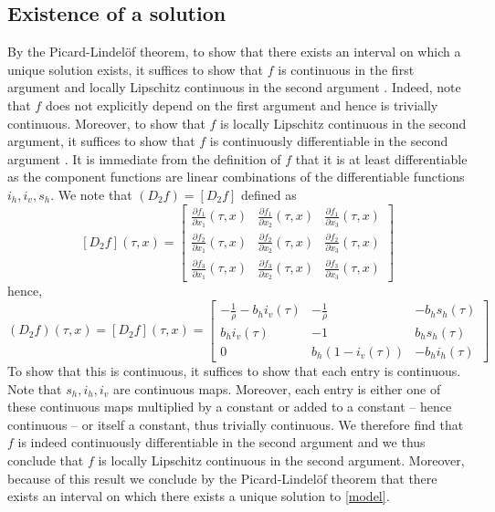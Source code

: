 \subsection{Existence of a solution}
By the Picard-Lindel\"{o}f theorem, to show that there exists an interval on which a unique solution exists, it suffices to show that $f$ is continuous in the first argument and locally Lipschitz continuous in the second argument \cite{lecturenotes}.
Indeed, note that $f$ does not explicitly depend on the first argument and hence is trivially continuous.
Moreover, to show that $f$ is locally Lipschitz continuous in the second argument, it suffices to show that $f$ is continuously differentiable in the second argument \cite{lecturenotes}.
It is immediate from the definition of $f$ that it is at least differentiable as the component functions are linear combinations of the differentiable functions $i_h,i_v,s_h$.
We note that $(D_2f) = [D_2f]$ defined as \[
    [D_2f](\tau,x) = \begin{bmatrix}
          \frac{\partial f_1}{\partial x_1}(\tau,x)
        & \frac{\partial f_1}{\partial x_2}(\tau,x)
        & \frac{\partial f_1}{\partial x_3}(\tau,x)
        \\
          \frac{\partial f_2}{\partial x_1}(\tau,x)
        & \frac{\partial f_2}{\partial x_2}(\tau,x)
        & \frac{\partial f_2}{\partial x_3}(\tau,x)
        \\
          \frac{\partial f_3}{\partial x_1}(\tau,x)
        & \frac{\partial f_3}{\partial x_2}(\tau,x)
        & \frac{\partial f_3}{\partial x_3}(\tau,x)
    \end{bmatrix}
\]
hence, \begin{equation}
    (D_2f)(\tau,x) = [D_2f](\tau,x) = \begin{bmatrix}
        - \frac{1}{\rho} - b_h i_v(\tau) & - \frac{1}{\rho} & -b_h s_h(\tau) \\
        b_h i_v(\tau) & -1 & b_h s_h(\tau) \\
        0 & b_h(1 - i_v(\tau)) & -b_h i_h(\tau)
    \end{bmatrix}
\end{equation}
To show that this is continuous, it suffices to show that each entry is continuous.
Note that $s_h,i_h,i_v$ are continuous maps.
Moreover, each entry is either one of these continuous maps multiplied by a constant or added to a constant -- hence continuous -- or itself a constant, thus trivially continuous.
We therefore
find that $f$ is indeed continuously differentiable in the second argument and we thus conclude
that $f$ is locally Lipschitz continuous in the second argument.
Moreover, because of this result we conclude by the Picard-Lindel\"{o}f theorem that there
exists an interval on which there exists a unique solution to \ref{model}.

